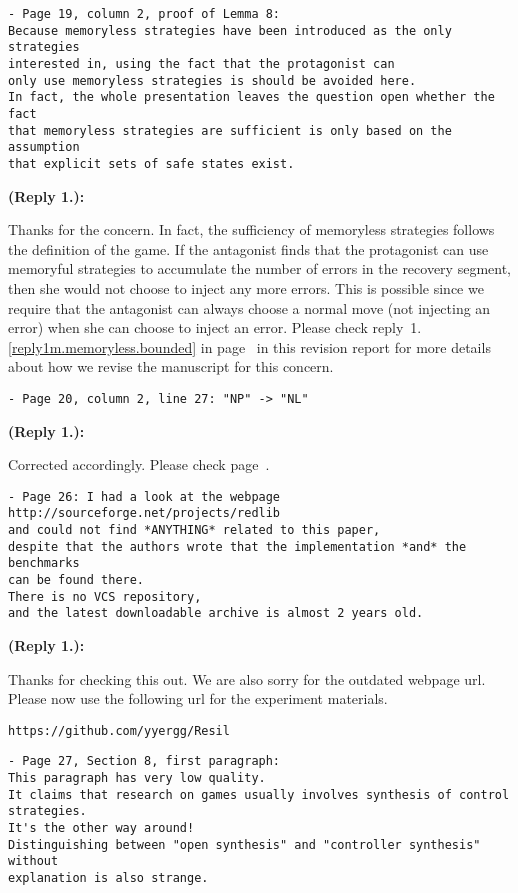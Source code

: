 \documentclass[times,10pt,twocolumn]{article}
\newcounter{cabbage0}
\newcounter{cabbage1}
\newcounter{cabbage2}
\newcounter{cabbage3}
\newcounter{bean0}
\newcounter{bean1}
\newcounter{bean2}
\newcounter{bean3}
\newcounter{bean4}
\newcounter{bean5}
\newcounter{bean6}
\newenvironment{reply1}{\begin{list}{\bf (Reply 1.\arabic{bean1}):} 
        {\usecounter{bean1}\setcounter{bean1}{\value{cabbage1}} \item \setcounter{cabbage1}{\value{bean1}} 
        }
}{\end{list}}
\begin{document}
\begin{verbatim} 
- Page 19, column 2, proof of Lemma 8: 
Because memoryless strategies have been introduced as the only strategies
interested in, using the fact that the protagonist can 
only use memoryless strategies is should be avoided here. 
In fact, the whole presentation leaves the question open whether the fact 
that memoryless strategies are sufficient is only based on the assumption 
that explicit sets of safe states exist.
\end{verbatim} 
\begin{reply1} 
Thanks for the concern. 
In fact, the sufficiency of memoryless strategies follows 
the definition of the game. 
If the antagonist finds that the protagonist can use memoryful strategies to 
accumulate the number of errors in the recovery segment, 
then she would not choose to inject any more errors.  
This is possible since we require that the antagonist can always choose a 
normal move (not injecting an error) when she can choose to inject an error. 
Please check reply~1.\ref{reply1m.memoryless.bounded}
in page~\pageref{reply1m.memoryless.bounded} in this revision report 
for more details about how we revise the manuscript for this concern. 
\end{reply1} 
\begin{verbatim} 
- Page 20, column 2, line 27: "NP" -> "NL"
\end{verbatim}
\begin{reply1}
Corrected accordingly. 
Please check page~\pageref{reply1.NL.complete}.
\end{reply1} 
\begin{verbatim}
- Page 26: I had a look at the webpage http://sourceforge.net/projects/redlib 
and could not find *ANYTHING* related to this paper, 
despite that the authors wrote that the implementation *and* the benchmarks 
can be found there. 
There is no VCS repository, 
and the latest downloadable archive is almost 2 years old.
\end{verbatim} 
\begin{reply1} 
Thanks for checking this out. 
We are also sorry for the outdated webpage url. 
Please now use the following url for the experiment materials. 
\begin{center}
\verb+https://github.com/yyergg/Resil+
\end{center} 
\end{reply1} 
\begin{verbatim} 
- Page 27, Section 8, first paragraph: 
This paragraph has very low quality. 
It claims that research on games usually involves synthesis of control strategies. 
It's the other way around! 
Distinguishing between "open synthesis" and "controller synthesis" without 
explanation is also strange.
\end{verbatim} 
\end{document}
